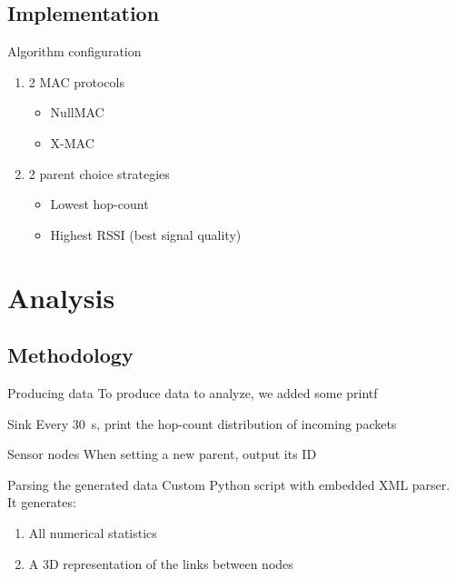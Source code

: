 \documentclass[14pt,aspectratio=169,xcolor={usenames,dvipsnames}]{beamer}
\begin{document}
\subsection{Implementation}

\begin{frame}{Algorithm configuration}
\begin{enumerate}
\item 2 MAC protocols
\begin{itemize}
\item NullMAC
\item X-MAC
\end{itemize}
\item 2 parent choice strategies
\begin{itemize}
\item Lowest hop-count
\item Highest RSSI (best signal quality)
\end{itemize}
\end{enumerate}
\end{frame}


\section{Analysis}

\subsection{Methodology}

\begin{frame}{Producing data}
To produce data to analyze, we added some \textsf{printf}
\vspace{1cm}
\begin{block}{Sink}
Every \SI{30}{\second}, print the hop-count distribution of incoming packets
\end{block}
\begin{block}{Sensor nodes}
When setting a new parent, output its ID
\end{block}
\end{frame}


\begin{frame}{Parsing the generated data}
Custom Python script with embedded XML parser.\\
It generates:

\begin{enumerate}
\item All numerical statistics
\item A 3D representation of the links between nodes
\end{enumerate}
\end{frame}
\end{document}
